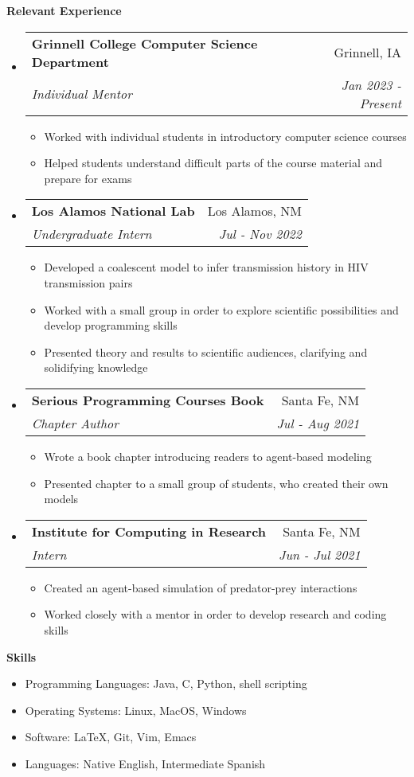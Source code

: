 \documentclass[letterpaper,11pt]{article}
\makeatletter
\newcommand{\resitem}[1]{\item #1 \vspace{-2pt}}
\newcommand{\resheading}[1]{{\large \colorbox{mygrey}{\begin{minipage}{\textwidth}{\textbf{#1 \vphantom{p\^{E}}}}\end{minipage}}}}
\newcommand{\ressubheading}[4]{
\begin{tabular*}{7.0in}{l@{\extracolsep{\fill}}r}
		\textbf{#1} & #2 \\
		\textit{#3} & \textit{#4} \\
\end{tabular*}\vspace{-6pt}}
\makeatother
\begin{document}
\resheading{Relevant Experience}
\begin{itemize}
\item
    \ressubheading{Grinnell College Computer Science Department}{Grinnell,
	IA}{Individual Mentor}{Jan 2023 - Present}
	\begin{itemize}
		\resitem{Worked with individual students in introductory
		computer science courses}
		\resitem{Helped students understand difficult parts of the
		course material and prepare for exams}
	\end{itemize}

\item
    \ressubheading{Los Alamos National Lab}{Los Alamos, NM}{Undergraduate Intern}{Jul - Nov 2022}
	\begin{itemize}
		\resitem{Developed a coalescent model to infer transmission history in HIV transmission pairs}
		\resitem{Worked with a small group in order to explore scientific possibilities and develop programming skills}
		\resitem{Presented theory and results to scientific audiences, clarifying and solidifying knowledge}
	\end{itemize}

\item
    \ressubheading{Serious Programming Courses Book}{Santa Fe, NM}{Chapter Author}{Jul - Aug 2021}
	\begin{itemize}
		\resitem{Wrote a book chapter introducing readers to agent-based modeling}
		\resitem{Presented chapter to a small group of students, who created their own models}
	\end{itemize}

\item
    \ressubheading{Institute for Computing in Research}{Santa Fe, NM}{Intern}{Jun - Jul 2021}
	\begin{itemize}
		\resitem{Created an agent-based simulation of predator-prey interactions}
		\resitem{Worked closely with a mentor in order to develop research and coding skills} 
	\end{itemize}
\end{itemize}


\resheading{Skills}
\begin{itemize}
    \item
        {Programming Languages: Java, C, Python, shell scripting}
    \item
        {Operating Systems: Linux, MacOS, Windows}
    \item
	{Software: \LaTeX, Git, Vim, Emacs}
    \item
        {Languages: Native English, Intermediate Spanish}
\end{itemize}
\end{document}
